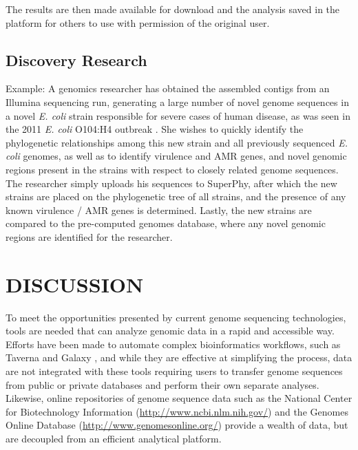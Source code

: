 \documentclass[a4paper,twoside]{article}
\begin{document}
The results are then made available for download and the analysis saved in the platform for others to use with permission of the original user.

\subsection{Discovery Research}
Example: A genomics researcher has obtained the assembled contigs from an Illumina sequencing run, generating a large number of novel genome sequences in a novel \textit{E. coli} strain responsible for severe cases of human disease, as was seen in the 2011 \textit{E. coli} O104:H4 outbreak \cite{mellmann_prospective_2011}. She wishes to quickly identify the phylogenetic relationships among this new strain and all previously sequenced \textit{E. coli} genomes, as well as to identify virulence and AMR genes, and novel genomic regions present in the strains with respect to closely related genome sequences. The researcher simply uploads his sequences to SuperPhy, after which the new strains are placed on the phylogenetic tree of all strains, and the presence of any known virulence / AMR genes is determined. Lastly, the new strains are compared to the pre-computed genomes database, where any novel genomic regions are identified for the researcher.

\section{\uppercase{Discussion}}
\label{sec:discussion}

To meet the opportunities presented by current genome sequencing technologies, tools are needed that can analyze genomic data in a rapid and accessible way. Efforts have been made to automate complex bioinformatics workflows, such as Taverna \cite{lanzen_taverna_2008} and Galaxy \cite{goecks_galaxy:_2010}, and while they are effective at simplifying the process, data are not integrated with these tools requiring users to transfer genome sequences from public or private databases and perform their own separate analyses. Likewise, online repositories of genome sequence data such as the National Center for Biotechnology Information (\url{http://www.ncbi.nlm.nih.gov/}) and the Genomes Online Database (\url{http://www.genomesonline.org/}) provide a wealth of data, but are decoupled from an efficient analytical platform. 
\end{document}
